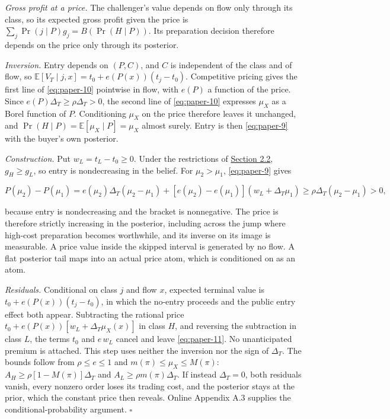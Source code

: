 \emph{Gross profit at a price.} The challenger's value depends on flow
only through its class, so its expected gross profit given the price is
\(\sum_j\Pr(j\mid P)g_j=B(\Pr(H\mid P))\). Its preparation decision
therefore depends on the price only through its posterior.

\emph{Inversion.} Entry depends on \((P,C)\), and \(C\) is independent
of the class and of flow, so
\(\mathbb E[V_T\mid j,x]=t_0+e(P(x))(t_j-t_0)\). Competitive pricing
gives the first line of \eqref{eq:paper-10} pointwise in flow, with
\(e(P)\) a function of the price. Since
\(e(P)\Delta_T\ge\rho\Delta_T>0\), the second line of
\eqref{eq:paper-10} expresses \(\mu_X\) as a Borel function of \(P\).
Conditioning \(\mu_X\) on the price therefore leaves it unchanged, and
\(\Pr(H\mid P)=\mathbb E[\mu_X\mid P]=\mu_X\) almost surely. Entry is
then \eqref{eq:paper-9} with the buyer's own posterior.

\emph{Construction.} Put \(w_L=t_L-t_0\ge0\). Under the restrictions of
\hyperref[sec-values-preparation-and-the-sale]{Section 2.2},
\(g_H\ge g_L\), so entry is nondecreasing in the belief. For
\(\mu_2>\mu_1\), \eqref{eq:paper-9} gives

\[
P(\mu_2)-P(\mu_1)
=e(\mu_2)\Delta_T(\mu_2-\mu_1)+[e(\mu_2)-e(\mu_1)](w_L+\Delta_T\mu_1)
\ge\rho\Delta_T(\mu_2-\mu_1)>0,
\tag{A.3}\label{eq:paper-a-3}
\]

because entry is nondecreasing and the bracket is nonnegative. The price
is therefore strictly increasing in the posterior, including across the
jump where high-cost preparation becomes worthwhile, and its inverse on
its image is measurable. A price value inside the skipped interval is
generated by no flow. A flat posterior tail maps into an actual price
atom, which is conditioned on as an atom.

\emph{Residuals.} Conditional on class \(j\) and flow \(x\), expected
terminal value is \(t_0+e(P(x))(t_j-t_0)\), in which the no-entry
proceeds and the public entry effect both appear. Subtracting the
rational price \(t_0+e(P(x))[w_L+\Delta_T\mu_X(x)]\) in class \(H\), and
reversing the subtraction in class \(L\), the terms \(t_0\) and
\(e\,w_L\) cancel and leave \eqref{eq:paper-11}. No unanticipated
premium is attached. This step uses neither the inversion nor the sign
of \(\Delta_T\). The bounds follow from \(\rho\le e\le1\) and
\(m(\pi)\le\mu_X\le M(\pi)\): \(A_H\ge\rho[1-M(\pi)]\Delta_T\) and
\(A_L\ge\rho m(\pi)\Delta_T\). If instead \(\Delta_T=0\), both residuals
vanish, every nonzero order loses its trading cost, and the posterior
stays at the prior, which the constant price then reveals. Online
Appendix A.3 supplies the conditional-probability argument. \(\square\)
